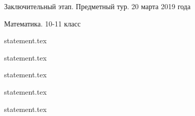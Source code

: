 \documentclass[a4paper,11pt, oneside]{book}
\begin{document}
\vspace{-3mm}
\vspace{-5mm}
\vspace{-5mm}

\normalsize

\begin{center}
    Заключительный этап. Предметный тур. 20 марта 2019 года
    
    Математика. 10-11 класс
\end{center}

\parindent=0cm

{statement.tex}

{statement.tex}

{statement.tex}

{statement.tex}

\clearpage

{statement.tex}
\end{document}
